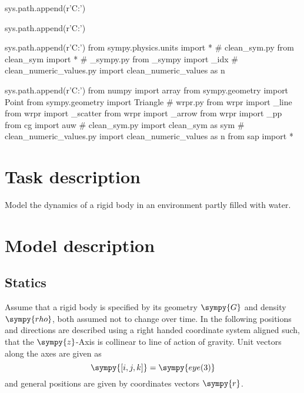 \documentclass[12pt,a4paper]{article}
\newcommand{\s}{\sympy}
\begin{document}
\begin{sympycode}
sys.path.append(r'C:\Users\Murad\evrythg')
\end{sympycode}
\begin{pylabcode}
sys.path.append(r'C:\Users\Murad\evrythg')
\end{pylabcode}
\tableofcontents

\begin{sympycode}
sys.path.append(r'C:\Users\Murad\evrythg')
from sympy.physics.units import *
# clean_sym.py
from clean_sym import *
# _sympy.py 
from _sympy import _idx
# clean_numeric_values.py
import clean_numeric_values as n
\end{sympycode}

\begin{pylabcode}
sys.path.append(r'C:\Users\Murad\evrythg')
from numpy import array
from sympy.geometry import Point
from sympy.geometry import Triangle
# wrpr.py
from wrpr import _line
from wrpr import _scatter
from wrpr import _arrow
from wrpr import _pp
from cg import  auw
# clean_sym.py
import clean_sym as sym
# clean_numeric_values.py
import clean_numeric_values as n
from sap import *
\end{pylabcode}


\section{Task description}
Model the dynamics of a rigid body in an environment partly filled with water.
\section{Model description}
\subsection{Statics}
Assume that a rigid body is specified by its geometry $\s{G}$ and density $\s{rho}$, both assumed not to change over time.    In the following positions and directions are described using a right handed coordinate system aligned such, that the $\s{z}$-Axis is collinear to line of action of gravity.  Unit vectors along the axes are given as
\begin{equation*}
\s{[i, j, k]} = \s{eye(3)}
\end{equation*}
and general positions are given by coordinates vectors $\s{r}$.  
\end{document}
